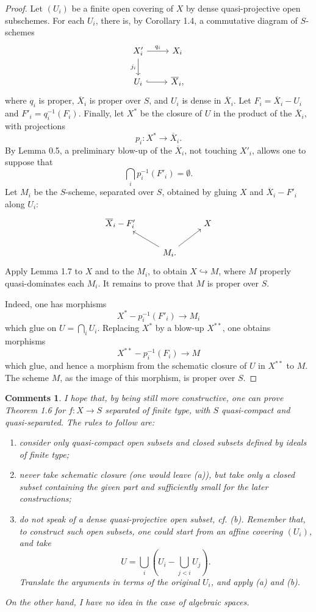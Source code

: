\documentclass[11pt]{article}
\newtheorem*{comments}{Comments}
\begin{document}
\begin{proof}
Let \((U_i)\) be a finite open covering of \(X\) by dense quasi-projective open subschemes. For each \(U_i\), there is, by Corollary 1.4, a commutative diagram of \(S\)-schemes
\[
\begin{tikzcd}
X'_i \ar[r,"q_i"] \ar[d,"j_i"'] & X_i \\
U_i \ar[r,hook] & \overline X_i,
\end{tikzcd}
\]
where \(q_i\) is proper, \(\overline X_i\) is proper over \(S\), and \(U_i\) is dense in \(\overline X_i\). Let \(F_i=\overline X_i-U_i\) and \(F'_i=q_i^{-1}(F_i)\). Finally, let \(X^*\) be the closure of \(U\) in the product of the \(\overline X_i\), with projections
\[
p_i:X^*\to \overline X_i.
\]
By Lemma 0.5, a preliminary blow-up of the \(\overline X_i\), not touching \(X'_i\), allows one to suppose that
\[
\bigcap_i p_i^{-1}(F'_i)=\emptyset.
\]
Let \(M_i\) be the \(S\)-scheme, separated over \(S\), obtained by gluing \(X\) and \(\overline X_i-F'_i\) along \(U_i\):
\[
\begin{tikzcd}
\overline X_i-F'_i && X \\
& M_i. \ar[ul] \ar[ur]
\end{tikzcd}
\]
Apply Lemma 1.7 to \(X\) and to the \(M_i\), to obtain \(X\hookrightarrow M\), where \(M\) properly quasi-dominates each \(M_i\). It remains to prove that \(M\) is proper over \(S\).

Indeed, one has morphisms
\[
X^*-p_i^{-1}(F'_i)\longrightarrow M_i
\]
which glue on \(U=\bigcap_i U_i\). Replacing \(X^*\) by a blow-up \(X^{**}\), one obtains morphisms
\[
X^{**}-p_i^{-1}(F_i)\longrightarrow M
\]
which glue, and hence a morphism from the schematic closure of \(U\) in \(X^{**}\) to \(M\). The scheme \(M\), as the image of this morphism, is proper over \(S\).
\end{proof}

\begin{comments}
I hope that, by being still more constructive, one can prove Theorem 1.6 for \(f:X\to S\) separated of finite type, with \(S\) quasi-compact and quasi-separated. The rules to follow are:
\begin{enumerate}[label=(\alph*)]
\item consider only quasi-compact open subsets and closed subsets defined by ideals of finite type;
\item never take schematic closure (one would leave (a)), but take only a closed subset containing the given part and sufficiently small for the later constructions;
\item do not speak of a dense quasi-projective open subset, cf. (b). Remember that, to construct such open subsets, one could start from an affine covering \((U_i)\), and take
\[
U=\bigcup_i\left(U_i-\bigcup_{j<i}U_j\right).
\]
Translate the arguments in terms of the original \(U_i\), and apply (a) and (b).
\end{enumerate}
On the other hand, I have no idea in the case of algebraic spaces.
\end{comments}
\end{document}
